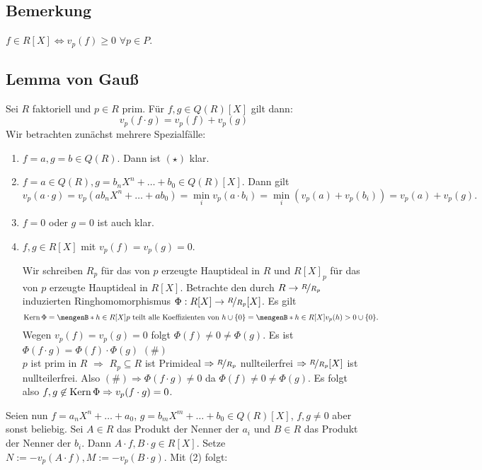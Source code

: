 \subsection[Bemerkung: Ordnungsabbildung zum testen, ob Koeffizienten im Ring]{Bemerkung} %
\label{sub:812}
$f \in R[X] \iff v_p(f)\ge 0$ $\forall p \in P$.

\subsection{Lemma von Gauß} %
\label{sub:813}
Sei $R$ faktoriell und $p \in R$ prim. Für $f,g \in Q(R)[X]$ gilt dann: 
\[
	v_p(f \cdot g) = v_p(f)+ v_p(g) \tag{$\star$}
\]
Wir betrachten zunächst mehrere Spezialfälle:
\begin{enumerate}[(1)]
	\item $f =a, g=b \in Q(R)$. Dann ist $(\star)$ klar.
	\item $f= a \in Q(R), g= b_n X^n + \ldots + b_0 \in Q(R)[X]$. Dann gilt
	\[
		v_p(a \cdot g) = v_p(a b_n X^n + \ldots + a b_0) = \min_i v_p(a \cdot b_i) = \min_i (v_p(a)+ v_p(b_i)) = v_p(a) + v_p(g).
	\]
	\item $f=0$ oder $g=0$ ist auch klar.
	\item $f,g \in R[X]$ mit $v_p(f)=v_p(g)=0$. 
	
	Wir schreiben $R_p$ für das von $p$ erzeugte Hauptideal in $R$ und $R[X]_p$ für das von $p$ erzeugte Hauptideal in $R[X]$. Betrachte den durch $R \to \nicefrac{R}{R_p}$
	induzierten Ringhomomorphismus $\Phi : R[X] \to \nicefrac{R}{R_p}[X]$. Es gilt 
	\[
		\Kern \Phi = \set[{h \in R[X]}]{p \text{ teilt alle Koeffizienten von }h} \cup \{0\}  = \set[{h \in R[X]}]{v_p(h) > 0} \cup \{0\}. 
	\]
	Wegen $v_p(f) = v_p(g)=0$ folgt $\Phi(f) \not= 0 \not= \Phi (g)$. Es ist $\Phi(f \cdot g) = \Phi(f) \cdot \Phi(g)$ \hfill $(\#)$ \\
	$p$ ist prim in $R$ $\Rightarrow $ $R_p \subseteq R$ ist Primideal $\Rightarrow \nicefrac{R}{R_p}$ nullteilerfrei $\Rightarrow \nicefrac{R}{R_p}[X]$ ist nullteilerfrei.
	Also $(\#) \Rightarrow \Phi(f \cdot g) \not= 0$ da $\Phi(f) \not= 0 \not= \Phi(g)$. Es folgt also $f,g \not\in \operatorname{Kern} \Phi \Rightarrow v_p(f \cdot g)=0$.
\end{enumerate}
Seien nun $f = a_n X^n + \ldots + a_0$, $g = b_m X^m + \ldots + b_0 \in Q(R)[X]$, $f,g \not= 0$ aber sonst beliebig. Sei $A \in R$ das Produkt der Nenner der $a_i$ und 
$B \in R$ das Produkt der Nenner der $b_i$. Dann $A \cdot f, B \cdot g \in R[X]$. Setze $N := - v_p(A \cdot f), M := - v_p(B \cdot g)$. Mit (2) folgt:
